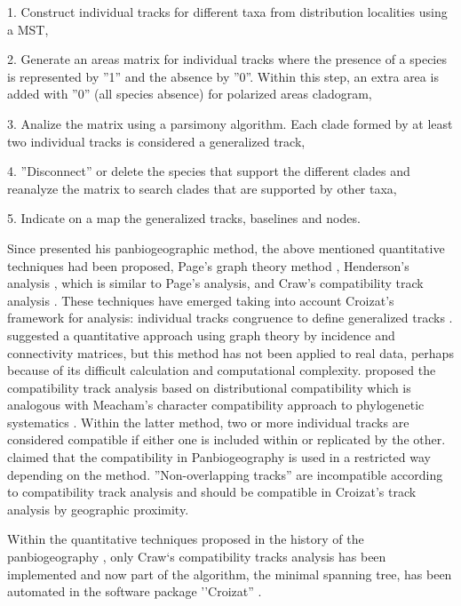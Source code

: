 1. Construct individual tracks for different taxa from distribution localities using a MST,

2. Generate an areas matrix for individual tracks where the presence of a species is represented by ''1'' and the absence by ''0''. Within this step, an extra area is added with ''0'' (all species absence) for polarized areas cladogram,

3. Analize the matrix using a parsimony algorithm. Each clade formed by at least two individual tracks is considered a generalized track,

4. ''Disconnect'' or delete the species that support the different clades and reanalyze the matrix to search clades that are supported by other taxa,

5. Indicate on a map the generalized tracks, baselines and nodes.

Since \citet{Croizat1958, Croizat1964} presented his panbiogeographic method,
the above mentioned quantitative techniques had been proposed, Page's graph
theory method \citep{Page1987},
Henderson's analysis \citep{Henderson1989}, which is similar to Page's analysis,
and Craw's compatibility track analysis \citep{Craw1989a}. These techniques have
emerged taking
into account Croizat's framework for analysis: individual tracks congruence to
define generalized tracks \citep{Page1987, Henderson1989, Craw1989b}.
\citet{Page1987} suggested a quantitative approach using graph theory by
incidence and connectivity matrices, but this method has not been applied to
real data, perhaps because of its difficult calculation and computational
complexity. \citet{Craw1989a} proposed the compatibility track analysis based on
distributional compatibility which is analogous with Meacham's character
compatibility approach \citep{Meacham1984} to phylogenetic systematics
\citep{Crawetal1999}. Within the latter method, two or more individual tracks
are considered compatible if either one is included within or replicated by the
other. \citet{MorroneCrisci1995} claimed that the compatibility in
Panbiogeography is used in a restricted way depending on the method.
''Non-overlapping tracks'' are incompatible according to compatibility track
analysis and should be compatible in Croizat's track analysis by geographic
proximity.

Within the quantitative techniques proposed in the history of the
panbiogeography \citep{Page1987, Craw1989a, Henderson1989}, only
Craw`s compatibility tracks analysis has been implemented and now part of the
algorithm, the minimal spanning tree, has been automated in the software
package ''Croizat'' \citep{Cavalcanti2009b}.

